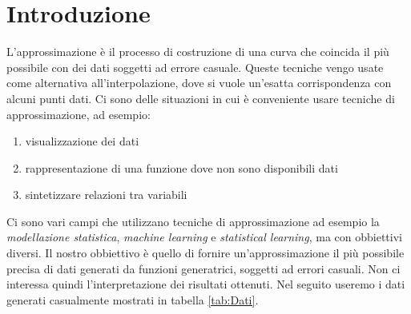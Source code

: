 \documentclass[../main.tex]{subfiles}
\begin{document}
\section{Introduzione}
L'approssimazione è il processo di costruzione di una curva che coincida il più possibile con dei  dati soggetti ad errore casuale.
Queste tecniche vengo usate come alternativa all'interpolazione, dove si vuole un'esatta corrispondenza con alcuni punti dati.
Ci sono delle situazioni in cui è conveniente usare tecniche di approssimazione, ad esempio:
\begin{enumerate}
    \item visualizzazione dei dati
    \item rappresentazione di una funzione dove non sono disponibili dati
    \item sintetizzare relazioni tra variabili
\end{enumerate}
Ci sono vari campi che utilizzano tecniche di approssimazione ad esempio la \textit{modellazione statistica}, \textit{machine learning} e 
\textit{statistical learning}, ma con obbiettivi diversi.
Il nostro obbiettivo è quello di fornire un'approssimazione il più possibile precisa di dati generati da funzioni generatrici, soggetti ad errori casuali.
Non ci interessa quindi l'interpretazione dei risultati ottenuti.
Nel seguito useremo i dati generati casualmente mostrati in tabella \ref{tab:Dati}.
\end{document}
